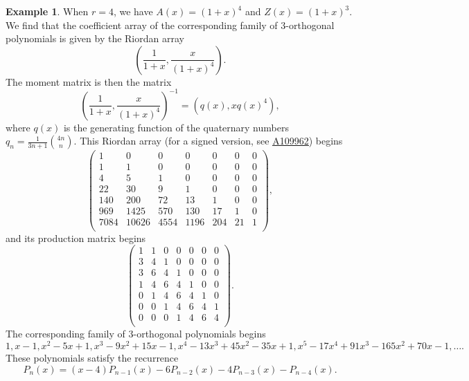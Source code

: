\documentclass[12pt,reqno]{article}
\theoremstyle{definition}
\newtheorem{example}[theorem]{Example}
\newcommand{\seqnum}[1]{\href{http://oeis.org/#1}{\underline{#1}}}
\begin{document}
\begin{example} When $r=4$, we have $A(x)=(1+x)^4$ and $Z(x)=(1+x)^3$. We find that the coefficient array of the corresponding family of $3$-orthogonal polynomials is given by the Riordan array
$$\left(\frac{1}{1+x}, \frac{x}{(1+x)^4}\right).$$ The moment matrix is then the matrix
 $$\left(\frac{1}{1+x}, \frac{x}{(1+x)^4}\right)^{-1}=(q(x), xq(x)^4),$$ where $q(x)$ is the generating function of the quaternary numbers
$q_n=\frac{1}{3n+1}\binom{4n}{n}$. This Riordan array (for a signed version, see \seqnum{A109962}) begins
$$\left(
\begin{array}{ccccccc}
1& 0 & 0 & 0 & 0 & 0 & 0 \\
1 & 1 & 0 & 0 & 0 & 0 & 0 \\
4 & 5 & 1 & 0 & 0 & 0 & 0 \\
22 & 30 & 9 & 1 & 0 & 0 & 0 \\
140 & 200 & 72 & 13 & 1 & 0 & 0 \\
969 & 1425 & 570 & 130 & 17 & 1 & 0 \\
7084 & 10626 & 4554 & 1196 & 204 & 21 & 1 \\
\end{array}\right),$$ and its production matrix begins
$$\left(
\begin{array}{ccccccc}
1 &1 & 0 & 0 & 0 & 0 & 0 \\
3 & 4 & 1 & 0 & 0 & 0 & 0 \\
3 & 6 & 4 & 1 & 0 & 0 & 0 \\
1 & 4 & 6 & 4 & 1 & 0 & 0 \\
0 & 1 & 4 & 6 & 4 & 1 & 0 \\
0 & 0 & 1 & 4 & 6 & 4 & 1 \\
0 & 0 & 0 & 1 & 4 & 6 & 4 \\
\end{array}\right).$$
The corresponding family of $3$-orthogonal polynomials begins
$$1, x - 1, x^2 - 5x + 1, x^3 - 9x^2 + 15x - 1, x^4 - 13x^3 + 45x^2 - 35x + 1, x^5 - 17x^4 + 91x^3 - 165x^2 + 70x - 1,\ldots.$$ These polynomials satisfy the recurrence
$$P_n(x)=(x-4)P_{n-1}(x)-6P_{n-2}(x)-4P_{n-3}(x)-P_{n-4}(x).$$
\end{example}
\end{document}
